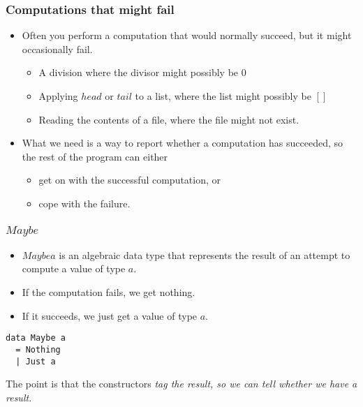 \documentclass{beamer}
\begin{document}
\begin{frame}[fragile]
\frametitle{Computations that might fail}

\begin{itemize}
\item Often you perform a computation that would normally succeed,
  but it might occasionally fail.
  \begin{itemize}
  \item A division where the divisor might possibly be 0
  \item Applying $head$ or $tail$ to a list, where the list might
    possibly be $[]$
  \item Reading the contents of a file, where the file might not exist.
  \end{itemize}
\item What we need is a way to report whether a computation has
  succeeded, so the rest of the program can either
  \begin{itemize}
  \item get on with the successful computation, or
  \item cope with the failure.
  \end{itemize}
\end{itemize}

\end{frame}

\begin{frame}[fragile]
\frametitle{$Maybe$}

\begin{itemize}
\item $Maybe a$ is an algebraic data type that represents the
  result of an attempt to compute a value of type $a$.
\item If the computation fails, we get nothing.
\item If it succeeds, we just get a value of type $a$.
\end{itemize}

\begin{verbatim}
data Maybe a
  = Nothing
  | Just a
\end{verbatim}

The point is that the constructors \emph{tag the result, so we can
  tell whether we have a result}.

\end{frame}
\end{document}
